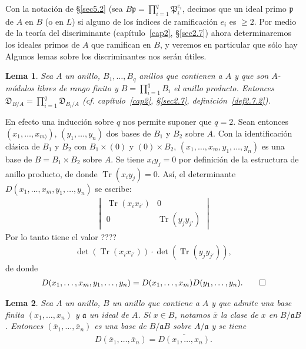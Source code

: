 \documentclass[bibtotoc,leqno,spanish]{amsbook}
\let\emph\relax %
\newcommand{\idl}[1]{\mathfrak{#1}}
\newcommand{\QED}{LQQD.}
\newcommand{\oline}[1]{\overline{#1}}
\newcommand{\disc}{\mathfrak{D}}
\DeclareMathOperator{\Tr}{Tr}
\numberwithin{equation}{section}
\theoremstyle{note}
\theoremstyle{note}
\newtheorem{lemma}{Lema}
\theoremstyle{rem}
\numberwithin{theorem}{section}
\numberwithin{proposition}{section}
\numberwithin{definition}{section}
\numberwithin{lemma}{section}
\numberwithin{corollary}{section}
\numberwithin{example}{section}
\numberwithin{footnote}{section}%
\begin{document}
Con la notaci\'on de \S\ref{sec5.2} (sea $B\idl{p}=\prod_{i=1}^{q}\idl{P}_{i}^{e_{i}}$, decimos que un ideal primo
$\idl{p}$ de $A$ \emph{ramifica} en $B$ (o en $L$) si alguno de los \'indices de ramificaci\'on $e_{i}$ es
$\geq 2$. Por medio de la teor\'ia del discriminante (cap\'itulo~\ref{cap2}, \S\ref{sec2.7}) ahora determinaremos los
ideales primos de $A$ que ramifican en $B$, y veremos en particular que s\'olo hay \emph{un n\'umero finito.}
Algunos lemas sobre los discriminantes nos ser\'an \'utiles.

\begin{lemma}\label{lem5.3.1}
Sea $A$ un anillo, $B_{1},\dots, B_{q}$ anillos que contienen a $A$ y que son $A$-m\'odulos libres de rango finito
y $B = \prod_{i=1}^{q}B_{i}$ el anillo producto. Entonces $\disc_{B/A}=\prod_{i=1}^{q}\disc_{B_{i}/A}$
(cf. cap\'itulo~\ref{cap2}, \S\ref{sec2.7}, definici\'on~\ref{def2.7.2}).
\end{lemma}

En efecto una inducci\'on sobre $q$ nos permite suponer que $q=2$. Sean entonces $(x_{1},\dots,x_{m)})$,
$(y_{1},\dots,y_{n})$ dos bases de $B_{1}$ y $B_{2}$ sobre $A$. Con la identificaci\'on cl\'asica de $B_{1}$ y
$B_{2}$ con $B_{1}\times(0)$ y $(0)\times B_{2}$, $(x_{1},\dots,x_{m},y_{1},\dots,y_{n})$ es una base de
$B = B_{1}\times B_{2}$ sobre $A$. Se tiene $x_{i}y_{j}=0$ por definici\'on de la estructura de anillo producto,
de donde $\Tr(x_{i}y_{j}) = 0$. As\'i, el determinante $D(x_{1},\dots,x_{m},y_{1},\dots,y_{n})$ se escribe:
\begin{gather*}
\begin{vmatrix}
\Tr(x_{i}x_{i'}) & 0\\
0 & \Tr(y_{j}y_{j'})
\end{vmatrix}
\end{gather*}
Por lo tanto tiene el valor ????
\begin{gather*}
\det(\Tr(x_{i}x_{i'}))\cdot\det(\Tr(y_{j}y_{j'})),
\end{gather*}
de donde
\begin{gather*}
D(x_{1},\dots,x_{m},y_{1},\dots,y_{n}) = D(x_{1},\dots,x_{m})D(y_{1},\dots,y_{n}).\qedhere%
\end{gather*}

\begin{lemma}\label{lem5.3.2}
Sea $A$ un anillo, $B$ un anillo que contiene a $A$ y que admite una base finita $(x_{1},\dots,x_{n})$ y
$\idl{a}$ un ideal de $A$. Si $x\in B$, notamos $\oline x$ la clase de $x$ en $B/\idl{a}B$. Entonces
$(\oline x_{1},\dots,\oline x_{n})$ es una base de $B/\idl{a}B$ sobre $A/\idl{a}$ y se tiene
\begin{gather}\label{eq-5.3-1}
D(\oline x_{1},\dots,\oline x_{n}) = \oline{D(x_{1},\dots,x_{n})}.
\end{gather}
\end{lemma}
\end{document}
